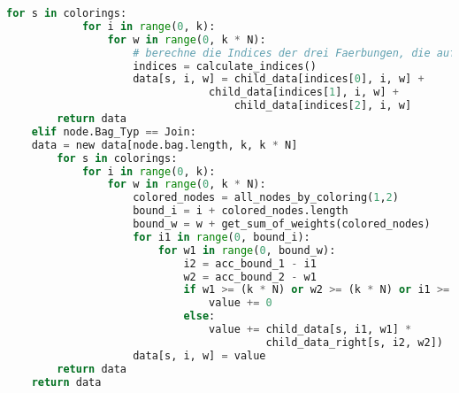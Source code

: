 \begin{svgraybox}
\begin{lstlisting}[language=python,label={code:pseudo}, basicstyle=\small, caption=Pseudocode für das dynamische Programm]
        for s in colorings:
            for i in range(0, k):
                for w in range(0, k * N):
                    # berechne die Indices der drei Faerbungen, die aufsummiert werden
                    indices = calculate_indices()
                    data[s, i, w] = child_data[indices[0], i, w] +
                    		    child_data[indices[1], i, w] +
                                    child_data[indices[2], i, w]
        return data
    elif node.Bag_Typ == Join:
	data = new data[node.bag.length, k, k * N]
        for s in colorings:
            for i in range(0, k):
                for w in range(0, k * N):
                    colored_nodes = all_nodes_by_coloring(1,2)
                    bound_i = i + colored_nodes.length
                    bound_w = w + get_sum_of_weights(colored_nodes)
                    for i1 in range(0, bound_i):
                        for w1 in range(0, bound_w):
                            i2 = acc_bound_1 - i1
                            w2 = acc_bound_2 - w1
                            if w1 >= (k * N) or w2 >= (k * N) or i1 >= k or i2 >= k:
                                value += 0
                            else:
                                value += child_data[s, i1, w1] *   
                                         child_data_right[s, i2, w2])
                    data[s, i, w] = value
        return data
    return data

\end{lstlisting}
\end{svgraybox}

